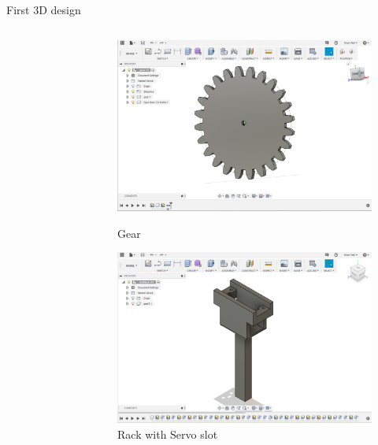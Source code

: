 \documentclass[10pt,a4paper]{beamer}
\begin{document}
\begin{frame}{First 3D design}
\begin{columns}
\begin{figure}
\end{figure}
\column{0.5\framewidth}
\begin{figure}
\includegraphics[height=0.3\textheight,  width=0.4\framewidth]{Gear.png}\caption{\small{Gear}}
\includegraphics[height=0.3\textheight,  width=0.4\framewidth]{Rack_with_Servo_slot.png}\caption{\small{Rack with Servo slot}}
\end{figure}
\end{columns}
\end{frame}
\end{document}
